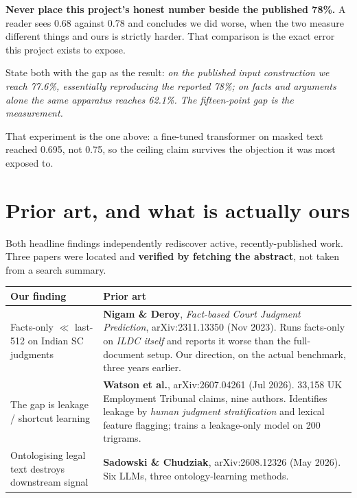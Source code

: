 \documentclass[12pt,a4paper]{article}
\begin{document}
\begin{tcolorbox}[plainbox,title={The comparison to refuse}]
\textbf{Never place this project's honest number beside the published 78\%.} A reader sees 0.68
against 0.78 and concludes we did worse, when the two measure different things and ours is strictly
harder. That comparison is the exact error this project exists to expose.

\smallskip
State both with the gap as the result: \emph{on the published input construction we reach 77.6\%,
essentially reproducing the reported 78\%; on facts and arguments alone the same apparatus reaches
62.1\%. The fifteen-point gap is the measurement.}
\end{tcolorbox}

That experiment is the one above: a fine-tuned transformer on masked text reached 0.695, not
0.75, so the ceiling claim survives the objection it was most exposed to.

\section{Prior art, and what is actually ours}\label{sec:prior}

Both headline findings independently rediscover active, recently-published work. Three papers were
located and \textbf{verified by fetching the abstract}, not taken from a search summary.

\begin{center}
\begin{tabular}{@{}p{4.6cm}p{9.2cm}@{}}
\toprule
\textbf{Our finding} & \textbf{Prior art} \\
\midrule
Facts-only $\ll$ last-512 on Indian SC judgments
 & \textbf{Nigam \& Deroy}, \emph{Fact-based Court Judgment Prediction}, arXiv:2311.13350 (Nov 2023).
   Runs facts-only on \emph{ILDC itself} and reports it worse than the full-document setup. Our
   direction, on the actual benchmark, three years earlier. \\
\addlinespace
The gap is leakage / shortcut learning
 & \textbf{Watson et al.}, arXiv:2607.04261 (Jul 2026). 33,158 UK Employment Tribunal claims, nine
   authors. Identifies leakage by \emph{human judgment stratification} and lexical feature flagging;
   trains a leakage-only model on 200 trigrams. \\
\addlinespace
Ontologising legal text destroys downstream signal
 & \textbf{Sadowski \& Chudziak}, arXiv:2608.12326 (May 2026). Six LLMs, three ontology-learning
   methods. \\
\bottomrule
\end{tabular}
\end{center}
\end{document}
